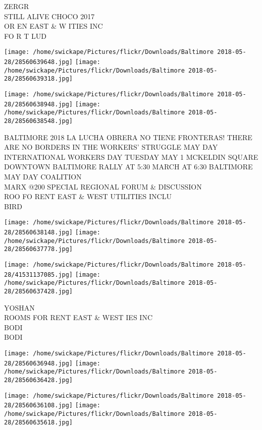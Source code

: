 \documentclass[10pt,letterpaper]{article}
\begin{document}
ZERGR\\
STILL ALIVE CHOCO 2017\\
OR EN EAST \& W ITIES INC\\
FO R T LUD\\
\pagebreak

\texttt{[image: /home/swickape/Pictures/flickr/Downloads/Baltimore 2018-05-28/28560639648.jpg]}
\texttt{[image: /home/swickape/Pictures/flickr/Downloads/Baltimore 2018-05-28/28560639318.jpg]}

\texttt{[image: /home/swickape/Pictures/flickr/Downloads/Baltimore 2018-05-28/28560638948.jpg]}
\texttt{[image: /home/swickape/Pictures/flickr/Downloads/Baltimore 2018-05-28/28560638548.jpg]}

BALTIMORE 2018 LA LUCHA OBRERA NO TIENE FRONTERAS!  THERE ARE NO BORDERS IN THE WORKERS' STRUGGLE MAY DAY INTERNATIONAL WORKERS DAY TUESDAY MAY 1 MCKELDIN SQUARE DOWNTOWN BALTIMORE RALLY AT 5:30 MARCH AT 6:30 BALTIMORE MAY DAY COALITION\\
MARX @200 SPECIAL REGIONAL FORUM \& DISCUSSION\\
ROO FO RENT EAST \& WEST UTILITIES INCLU\\
BIRD\\
\pagebreak

\texttt{[image: /home/swickape/Pictures/flickr/Downloads/Baltimore 2018-05-28/28560638148.jpg]}
\texttt{[image: /home/swickape/Pictures/flickr/Downloads/Baltimore 2018-05-28/28560637778.jpg]}

\texttt{[image: /home/swickape/Pictures/flickr/Downloads/Baltimore 2018-05-28/41531137085.jpg]}
\texttt{[image: /home/swickape/Pictures/flickr/Downloads/Baltimore 2018-05-28/28560637428.jpg]}

YOSHAN\\
ROOMS FOR RENT EAST \& WEST IES INC\\
BODI\\
BODI\\
\pagebreak

\texttt{[image: /home/swickape/Pictures/flickr/Downloads/Baltimore 2018-05-28/28560636948.jpg]}
\texttt{[image: /home/swickape/Pictures/flickr/Downloads/Baltimore 2018-05-28/28560636428.jpg]}

\texttt{[image: /home/swickape/Pictures/flickr/Downloads/Baltimore 2018-05-28/28560636108.jpg]}
\texttt{[image: /home/swickape/Pictures/flickr/Downloads/Baltimore 2018-05-28/28560635618.jpg]}
\end{document}
